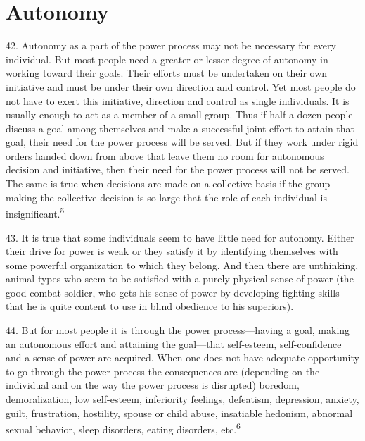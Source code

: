 \documentclass{article}
\begin{document}
\section{Autonomy}

\hspace{0.5cm} 42.  Autonomy as a part of the power process may not be necessary for every individual.  But most 
people need a greater or lesser degree of autonomy in working toward their goals.  Their efforts 
must be undertaken on their own initiative and must be under their own direction and control.  Yet 
most people do not have to exert this initiative, direction and control as single individuals.  It is 
usually enough to act as a member of a small group.  Thus if half a dozen people discuss a goal 
among themselves and make a successful joint effort to attain that goal, their need for the power 
process will be served.  But if they work under rigid orders handed down from above that leave 
them no room for autonomous decision and initiative, then their need for the power process will 
not be served.  The same is true when decisions are made on a collective basis if the group making 
the collective decision is so large that the role of each individual is insignificant.\textsuperscript{5} \vspace{\baselineskip} \newpage

43.  It is true that some individuals seem to have little need for autonomy.  Either their drive for 
power  is  weak  or  they  satisfy  it  by  identifying  themselves  with  some  powerful  organization  to  
which they belong.  And then there are unthinking, animal types who seem to be satisfied with a 
purely  physical  sense  of  power  (the  good  combat  soldier,  who  gets  his  sense  of  power  by  
developing fighting skills that he is quite content to use in blind obedience to his superiors). \vspace{\baselineskip}

44.  But for most people it is through the power process—having a goal, making an autonomous 
effort  and attaining  the  goal—that  self-esteem,  self-confidence  and a  sense  of  power are  
acquired.   When  one  does  not  have  adequate  opportunity  to  go  through  the  power  process  the  
consequences  are  (depending  on  the  individual  and  on  the  way  the  power  process  is  disrupted)  
boredom,  demoralization,  low  self-esteem,  inferiority  feelings,  defeatism,  depression,  anxiety, 
guilt, frustration, hostility, spouse or child abuse, insatiable hedonism, abnormal sexual behavior, 
sleep disorders, eating disorders, etc.\textsuperscript{6}
\end{document}

